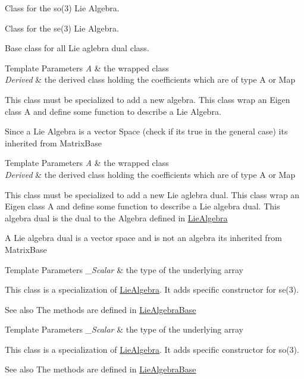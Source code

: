 Class for the so(3) Lie Algebra.

Class for the se(3) Lie Algebra.

Base class for all Lie aglebra dual class.


\begin{DoxyTemplParams}{Template Parameters}
{\em A} & the wrapped class \\
\hline
{\em Derived} & the derived class holding the coefficients which are of type A or Map\\
\hline
\end{DoxyTemplParams}
This class must be specialized to add a new algebra. This class wrap an Eigen class A and define some function to describe a Lie Algebra.

Since a Lie Algebra is a vector Space (check if it\textquotesingle{}s true in the general case) it\textquotesingle{}s inherited from Matrix\+Base


\begin{DoxyTemplParams}{Template Parameters}
{\em A} & the wrapped class \\
\hline
{\em Derived} & the derived class holding the coefficients which are of type A or Map\\
\hline
\end{DoxyTemplParams}
This class must be specialized to add a new Lie aglebra dual. This class wrap an Eigen class A and define some function to describe a Lie algebra dual. This algebra dual is the dual to the Algebra defined in \hyperlink{class_lie_algebra}{Lie\+Algebra}

A Lie algebra dual is a vector space and is not an algebra it\textquotesingle{}s inherited from Matrix\+Base


\begin{DoxyTemplParams}{Template Parameters}
{\em \+\_\+\+Scalar} & the type of the underlying array\\
\hline
\end{DoxyTemplParams}
This class is a specialization of \hyperlink{class_lie_algebra}{Lie\+Algebra}. It adds specific constructor for se(3).

\begin{DoxySeeAlso}{See also}
The methods are defined in \hyperlink{class_lie_algebra_base}{Lie\+Algebra\+Base}
\end{DoxySeeAlso}

\begin{DoxyTemplParams}{Template Parameters}
{\em \+\_\+\+Scalar} & the type of the underlying array\\
\hline
\end{DoxyTemplParams}
This class is a specialization of \hyperlink{class_lie_algebra}{Lie\+Algebra}. It adds specific constructor for so(3).

\begin{DoxySeeAlso}{See also}
The methods are defined in \hyperlink{class_lie_algebra_base}{Lie\+Algebra\+Base} 
\end{DoxySeeAlso}
